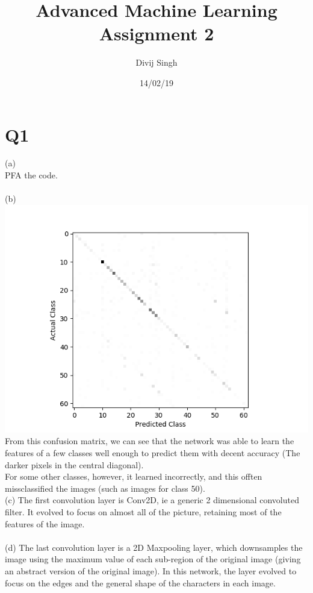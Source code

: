\documentclass{article}
\title{Advanced Machine Learning Assignment 2}
\author{Divij Singh}
\date{14/02/19}
\begin{document}
	\maketitle
	
	\section{Q1}
(a)\\
PFA the code.\\\\
(b)\\
\includegraphics[scale = 0.75]{1.png}\\
From this confusion matrix, we can see that the network was able to learn the features of a few classes well enough to predict them with decent accuracy (The darker pixels in the central diagonal). \\
For some other classes, however, it learned incorrectly, and this offten missclassified the images (such as images for class 50).\\

(c) The first convolution layer is Conv2D, ie a generic 2 dimensional convoluted filter. It evolved to focus on almost all of the picture, retaining most of the features of the image.\\\\
(d) The last convolution layer is a 2D Maxpooling layer, which downsamples the image using the maximum value of each sub-region of the original image (giving an abstract version of the original image). In this network, the layer evolved to focus on the edges and the general shape of the characters in each image.
\end{document}

